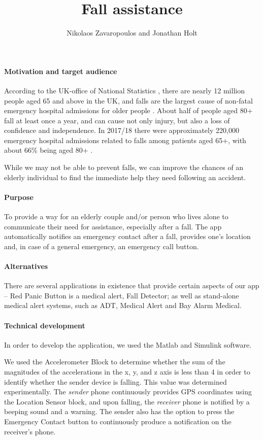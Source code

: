 \documentclass[12pt,a4paper]{article}
\title{Fall assistance}
\author{Nikolaos Zavaropoulos and Jonathan Holt}
\begin{document}
\maketitle
\paragraph{Motivation and target audience}
    According to the UK-office of National Statistics \citep{ONSstats}, there are nearly 12 million people aged 65 and above in the UK, and falls are the largest cause of non-fatal emergency hospital admissions for older people \citep{NHSInjuries}.
    About half of people aged 80+ fall at least once a year, and can cause not only injury, but also a loss of confidence and independence.
    In 2017/18 there were approximately 220,000 emergency hospital admissions related to falls among patients aged 65+, with about 66\% being aged 80+ \citep{GovUKFalls}.

    While we may not be able to prevent falls, we can improve the chances of an elderly individual to find the immediate help they need following an accident.

\paragraph{Purpose}
    To provide a way for an elderly couple and/or person who lives alone to communicate their need for assistance, especially after a fall.
    The app automatically notifies an emergency contact after a fall, provides one's location and, in case of a general emergency, an emergency call button. 

\paragraph{Alternatives}
    There are several applications in existence that provide certain aspects of our app -- Red Panic Button is a medical alert, Fall Detector; as well as stand-alone medical alert systems, such as ADT, Medical Alert and Bay Alarm Medical.

\paragraph{Technical development}
    In order to develop the application, we used the Matlab and Simulink software.

    We used the Accelerometer Block to determine whether the sum of the magnitudes of the accelerations in the x, y, and z axis is less than 4 in order to identify whether the sender device is falling.
    This value was determined experimentally. 
    The \textit{sender} phone continuously provides GPS coordinates using the Location Sensor block, and upon falling, the \textit{receiver} phone is notified by a beeping sound and a warning.
    The sender also has the option to press the Emergency Contact button to continuously produce a notification on the receiver’s phone. 
\end{document}
